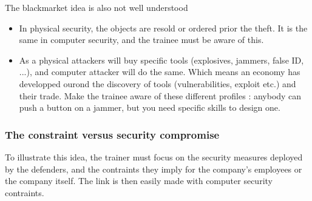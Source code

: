 \documentclass[11pt]{article} %
\begin{document}
The blackmarket idea is also not well understood
\begin{itemize}
\item In physical security, the objects are resold or ordered prior the theft. It is the
same in computer security, and the trainee must be aware of this. 
\item As a physical attackers will buy specific tools (explosives, jammers, 
false ID, ...), and computer attacker will do the same. Which means an economy  
has developped ourond the discovery of tools (vulnerabilities, exploit etc.) and their trade. 
Make the trainee aware of these different profiles : anybody can 
push a button on a jammer, but you need specific skills to design one.
\end{itemize}


\subsubsection{The constraint versus security compromise}
To illustrate this idea, the trainer must focus on the security measures 
deployed by the defenders, and the contraints they imply for the company's 
employees or the company itself. The link is then easily made with computer 
security contraints.
\end{document}
